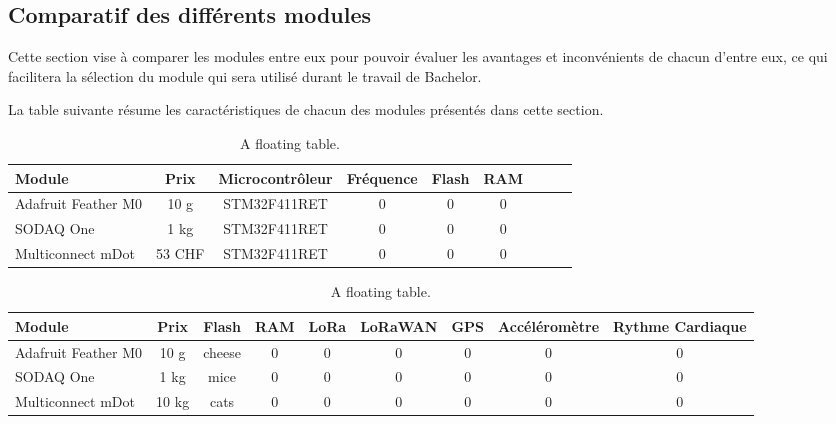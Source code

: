\subsection{Comparatif des différents modules}

Cette section vise à comparer les modules entre eux pour pouvoir évaluer les avantages et inconvénients de chacun d’entre eux, ce qui facilitera la sélection du module qui sera utilisé durant le travail de Bachelor.

La table suivante résume les caractéristiques de chacun des modules présentés dans cette section.

\begin{table}[tb]
\caption[A floating table]{A floating table.}
\label{tab:esempio}
\centering
\begin{tabular}{lcccccccc}
\toprule
Module & Prix & Microcontrôleur & Fréquence & Flash & RAM  \\ 
\midrule
Adafruit Feather M0	& 10 g	& STM32F411RET & 0 & 0 & 0 & \\
SODAQ One	& 1 kg & STM32F411RET & 0 & 0 & 0 \\
Multiconnect mDot & 53 CHF & STM32F411RET & 0 & 0 & 0 \\
\bottomrule 
\end{tabular}
\end{table}

\begin{table}[tb]
\caption[A floating table]{A floating table.}
\label{tab:esempio}
\centering
\begin{tabular}{lcccccccc}
\toprule
Module & Prix & Flash & RAM & LoRa & LoRaWAN & GPS & Accéléromètre & Rythme Cardiaque \\ 
\midrule
Adafruit Feather M0	& 10 g	& cheese & 0 & 0 & 0 & 0 & 0 & 0  \\
SODAQ One	& 1 kg	& mice & 0 & 0 & 0 & 0 & 0 & 0  \\
Multiconnect mDot	& 10 kg	& cats & 0 & 0 & 0 & 0 & 0 & 0  \\
\bottomrule 
\end{tabular}
\end{table}